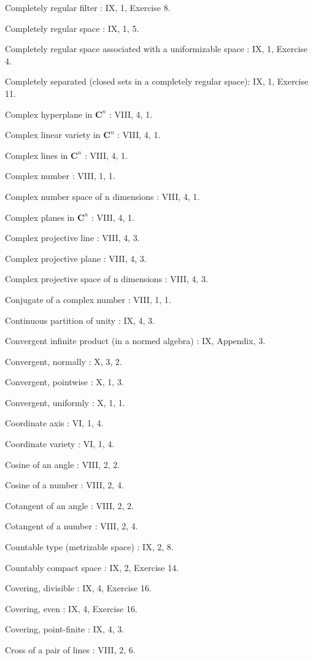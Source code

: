 Completely regular filter : IX, 1, Exercise 8.

Completely regular space : IX, 1, 5.

Completely regular space associated with a uniformizable space : IX, 1, Exercise 4.

Completely separated (closed sets in a completely regular space): IX, 1, Exercise 11.

Complex hyperplane in \(\mathbf{C}^n\) : VIII, 4, 1.

Complex linear variety in \(\mathbf{C}^n\) : VIII, 4, 1.

Complex lines in \(\mathbf{C}^n\) : VIII, 4, 1.

Complex number : VIII, 1, 1.

Complex number space of n dimensions : VIII, 4, 1.

Complex planes in \(\mathbf{C}^n\) : VIII, 4, 1.

Complex projective line : VIII, 4, 3.

Complex projective plane : VIII, 4, 3.

Complex projective space of n dimensions : VIII, 4, 3.

Conjugate of a complex number : VIII, 1, 1.

Continuous partition of unity : IX, 4, 3.

Convergent infinite product (in a normed algebra) : IX, Appendix, 3.

Convergent, normally : X, 3, 2.

Convergent, pointwise : X, 1, 3.

Convergent, uniformly : X, 1, 1.

Coordinate axis : VI, 1, 4.

Coordinate variety : VI, 1, 4.

Cosine of an angle : VIII, 2, 2.

Cosine of a number : VIII, 2, 4.

Cotangent of an angle : VIII, 2, 2.

Cotangent of a number : VIII, 2, 4.

Countable type (metrizable space) : IX, 2, 8.

Countably compact space : IX, 2, Exercise 14.

Covering, divisible : IX, 4, Exercise 16.

Covering, even : IX, 4, Exercise 16.

Covering, point-finite : IX, 4, 3.

Cross of a pair of lines : VIII, 2, 6.

